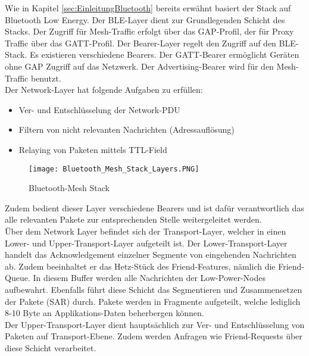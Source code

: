 Wie in Kapitel \ref{sec:EinleitungBluetooth} bereits erwähnt basiert der Stack auf Bluetooth Low Energy. Der BLE-Layer dient zur Grundlegenden Schicht des Stacks. Der Zugriff für Mesh-Traffic erfolgt über das GAP-Profil, der für Proxy Traffic über das GATT-Profil. Der Bearer-Layer regelt den Zugriff auf den BLE-Stack. Es existieren verschiedene Bearers. Der GATT-Bearer ermöglicht Geräten ohne GAP Zugriff auf das Netzwerk. Der Advertising-Bearer wird für den Mesh-Traffic benutzt. \\

Der Network-Layer hat folgende Aufgaben zu erfüllen: 

\begin{itemize}
	\item Ver- und Entschlüsselung der Network-PDU
	\item Filtern von nicht relevanten Nachrichten (Adressauflösung)
	\item Relaying von Paketen mittels TTL-Field
\end{itemize}

\begin{wrapfigure}{r}{0.5\textwidth}
	\centering
	\texttt{[image: Bluetooth\_Mesh\_Stack\_Layers.PNG]}
	\caption{Bluetooth-Mesh Stack \cite{bluetooth_sig_mesh-technology-overviewpdf_2020}} 
	\label{fig:BTMeshStack}
\end{wrapfigure}

Zudem bedient dieser Layer verschiedene Bearers und ist dafür verantwortlich das alle relevanten Pakete zur entsprechenden Stelle weitergeleitet werden. \\

Über dem Network Layer befindet sich der Transport-Layer, welcher in einen Lower- und Upper-Transport-Layer aufgeteilt ist. Der Lower-Transport-Layer handelt das Acknowledgement einzelner Segmente von eingehenden Nachrichten ab. Zudem beeinhaltet er das Hetz-Stück des Friend-Features, nämlich die Friend-Queue. In diesem Buffer werden alle Nachrichten der  Low-Power-Nodes aufbewahrt. Ebenfalls führt diese Schicht das Segmentieren und Zusammensetzen der Pakete (SAR) durch. Pakete werden in Fragmente aufgeteilt, welche lediglich 8-10 Byte an Applikations-Daten beherbergen können. \\

Der Upper-Transport-Layer dient hauptsächlich zur Ver- und Entschlüsselung von Paketen auf Transport-Ebene. Zudem werden Anfragen wie Friend-Requests über diese Schicht verarbeitet. \\

